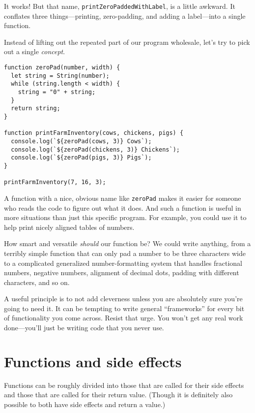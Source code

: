 It works! But that name, \lstinline`printZeroPaddedWithLabel`, is a little awkward. It conflates three things—printing, zero-padding, and adding a label—into a single function.

Instead of lifting out the repeated part of our program wholesale, let's try to pick out a single \emph{concept}.

\begin{lstlisting}
function zeroPad(number, width) {
  let string = String(number);
  while (string.length < width) {
    string = "0" + string;
  }
  return string;
}

function printFarmInventory(cows, chickens, pigs) {
  console.log(`${zeroPad(cows, 3)} Cows`);
  console.log(`${zeroPad(chickens, 3)} Chickens`);
  console.log(`${zeroPad(pigs, 3)} Pigs`);
}

printFarmInventory(7, 16, 3);
\end{lstlisting}
\noindent{}

A function with a nice, obvious name like \lstinline`zeroPad` makes it easier for someone who reads the code to figure out what it does. And such a function is useful in more situations than just this specific program. For example, you could use it to help print nicely aligned tables of numbers.

How smart and versatile \emph{should} our function be? We could write anything, from a terribly simple function that can only pad a number to be three characters wide to a complicated generalized number-formatting system that handles fractional numbers, negative numbers, alignment of decimal dots, padding with different characters, and so on.

A useful principle is to not add cleverness unless you are absolutely sure you're going to need it. It can be tempting to write general ``frameworks'' for every bit of functionality you come across. Resist that urge. You won't get any real work done—you'll just be writing code that you never use.

\label{functions.pure}\section{Functions and side effects}

Functions can be roughly divided into those that are called for their side effects and those that are called for their return value. (Though it is definitely also possible to both have side effects and return a value.)

